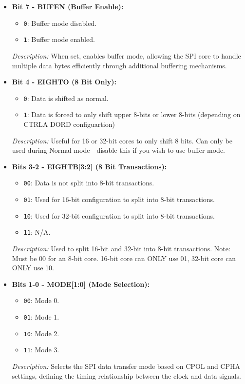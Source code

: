   
  \begin{itemize}
      \item \textbf{Bit 7 - BUFEN (Buffer Enable):} 
      \begin{itemize}
          \item \texttt{0}: Buffer mode disabled.
          \item \texttt{1}: Buffer mode enabled.
      \end{itemize}
      \textit{Description:} When set, enables buffer mode, allowing the SPI core to handle multiple data bytes efficiently through additional buffering mechanisms.
      
      \item \textbf{Bit 4 - EIGHTO (8 Bit Only):} 
      \begin{itemize}
          \item \texttt{0}: Data is shifted as normal.
          \item \texttt{1}: Data is forced to only shift upper 8-bits or lower 8-bits (depending on CTRLA DORD configuartion)
      \end{itemize}
      \textit{Description:} Useful for 16 or 32-bit cores to only shift 8 bits. Can only be used during Normal mode - disable this if you wish to use buffer mode.

      \item \textbf{Bits 3-2 - EIGHTB[3:2] (8 Bit Transactions):} 
      \begin{itemize}
          \item \texttt{00}: Data is not split into 8-bit transactions.
          \item \texttt{01}: Used for 16-bit configuration to split into 8-bit transactions.
          \item \texttt{10}: Used for 32-bit configuration to split into 8-bit transactions.
          \item \texttt{11}: N/A.
      \end{itemize}
      \textit{Description:} Used to split 16-bit and 32-bit into 8-bit transactions. Note: Must be 00 for an 8-bit core. 16-bit core can ONLY use 01, 32-bit core can ONLY use 10.

      \item \textbf{Bits 1-0 - MODE[1:0] (Mode Selection):} 
      \begin{itemize}
          \item \texttt{00}: Mode 0.
          \item \texttt{01}: Mode 1.
          \item \texttt{10}: Mode 2.
          \item \texttt{11}: Mode 3.
      \end{itemize}
      \textit{Description:} Selects the SPI data transfer mode based on CPOL and CPHA settings, defining the timing relationship between the clock and data signals.
  \end{itemize}
  
